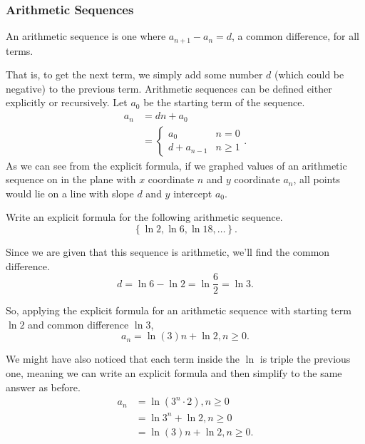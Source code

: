\subsubsection{Arithmetic Sequences}
\begin{definition}
	An arithmetic sequence is one where $a_{n+1} - a_{n} = d$, a common difference, for all terms.
\end{definition}

That is, to get the next term, we simply add some number $d$ (which could be negative) to the previous term.
Arithmetic sequences can be defined either explicitly or recursively.
Let $a_0$ be the starting term of the sequence.
\begin{align*}
	a_n &= dn + a_0 \\
	&= \begin{cases}
		a_0 & n = 0 \\
		d + a_{n-1} & n \geq 1
	\end{cases}.
\end{align*}
As we can see from the explicit formula, if we graphed values of an arithmetic sequence on in the plane with $x$ coordinate $n$ and $y$ coordinate $a_n$, all points would lie on a line with slope $d$ and $y$ intercept $a_0$.

\begin{example}
	Write an explicit formula for the following arithmetic sequence.
	\begin{equation*}
		\left\{\ln{2}, \ln{6}, \ln{18}, \ldots\right\}.
	\end{equation*}
\end{example}
\begin{answer}
	Since we are given that this sequence is arithmetic, we'll find the common difference.
	\begin{equation*}
		d = \ln{6} - \ln{2} = \ln{\frac{6}{2}} = \ln{3}.
	\end{equation*}
	
	So, applying the explicit formula for an arithmetic sequence with starting term $\ln{2}$ and common difference $\ln{3}$,
	\begin{equation*}
		a_n = \ln{(3)}n + \ln{2}, n\geq 0.
	\end{equation*}
	
	We might have also noticed that each term inside the $\ln$ is triple the previous one, meaning we can write an explicit formula and then simplify to the same answer as before.
	\begin{align*}
		a_n &= \ln{(3^{n}\cdot 2)}, n\geq 0 \\
		&= \ln{3^n} + \ln{2}, n \geq 0 \\
		&= \ln{(3)}n + \ln{2}, n \geq 0.
	\end{align*}
\end{answer}

